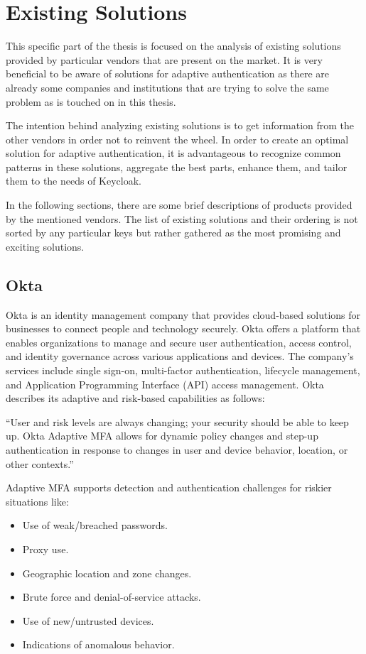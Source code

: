 \chapter{Existing Solutions} \label{existing-solutions}

This specific part of the thesis is focused on the analysis of existing solutions provided by particular vendors that are present on the market.
It is very beneficial to be aware of solutions for adaptive authentication as there are already some companies and institutions that are trying to solve the same problem as is touched on in this thesis.

The intention behind analyzing existing solutions is to get information from the other vendors in order not to reinvent the wheel.
In order to create an optimal solution for adaptive authentication, it is advantageous to recognize common patterns in these solutions, aggregate the best parts, enhance them, and tailor them to the needs of Keycloak. 

In the following sections, there are some brief descriptions of products provided by the mentioned vendors.
The list of existing solutions and their ordering is not sorted by any particular keys but rather gathered as the most promising and exciting solutions.

\section{Okta}

Okta is an identity management company that provides cloud-based solutions for businesses to connect people and technology securely.
Okta offers a platform that enables organizations to manage and secure user authentication, access control, and identity governance across various applications and devices.
The company's services include single sign-on, multi-factor authentication, lifecycle management, and Application Programming Interface (API) access management.
Okta describes its adaptive and risk-based capabilities as follows:

``User and risk levels are always changing; your security should be able to keep up.
Okta Adaptive MFA allows for dynamic policy changes and step-up authentication in response to changes in user and device behavior, location, or other contexts.''\cite{existing-okta}

\newpage
Adaptive MFA supports detection and authentication challenges for riskier situations like:

\begin{itemize}
    \item Use of weak/breached passwords.
    \item Proxy use.
    \item Geographic location and zone changes.
    \item Brute force and denial-of-service attacks.
    \item Use of new/untrusted devices.
    \item Indications of anomalous behavior. 
\end{itemize}

